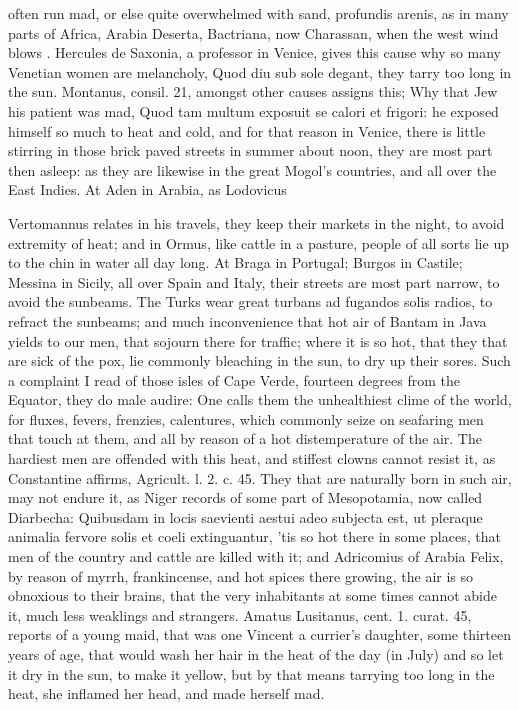 {{often run mad, or else quite overwhelmed with sand, profundis arenis,
as in many parts of Africa, Arabia Deserta, Bactriana, now Charassan,
when the west wind blows .
Hercules de Saxonia, a professor in Venice, gives this cause why
so many Venetian women are melancholy, Quod diu sub sole degant, they
tarry too long in the sun. Montanus, consil. 21, amongst other causes
assigns this; Why that Jew his patient was mad, Quod tam multum
exposuit se calori et frigori: he exposed himself so much to heat and
cold, and for that reason in Venice, there is little stirring in those
brick paved streets in summer about noon, they are most part then
asleep: as they are likewise in the great Mogol's countries, and all
over the East Indies. At Aden in Arabia, as Lodovicus

Vertomannus relates in his travels, they keep their markets in the
night, to avoid extremity of heat; and in Ormus, like cattle in a
pasture, people of all sorts lie up to the chin in water all day long.
At Braga in Portugal; Burgos in Castile; Messina in Sicily, all over
Spain and Italy, their streets are most part narrow, to avoid the
sunbeams. The Turks wear great turbans ad fugandos solis radios, to
refract the sunbeams; and much inconvenience that hot air of Bantam in
Java yields to our men, that sojourn there for traffic; where it is so
hot, that they that are sick of the pox, lie commonly bleaching
in the sun, to dry up their sores. Such a complaint I read of those
isles of Cape Verde, fourteen degrees from the Equator, they do male
audire: One calls them the unhealthiest clime of the world, for
fluxes, fevers, frenzies, calentures, which commonly seize on seafaring
men that touch at them, and all by reason of a hot distemperature of
the air. The hardiest men are offended with this heat, and stiffest
clowns cannot resist it, as Constantine affirms, Agricult. l. 2. c. 45.
They that are naturally born in such air, may not endure it, as
Niger records of some part of Mesopotamia, now called Diarbecha:
Quibusdam in locis saevienti aestui adeo subjecta est, ut pleraque
animalia fervore solis et coeli extinguantur, 'tis so hot there in some
places, that men of the country and cattle are killed with it; and
Adricomius of Arabia Felix, by reason of myrrh, frankincense, and
hot spices there growing, the air is so obnoxious to their brains, that
the very inhabitants at some times cannot abide it, much less weaklings
and strangers. Amatus Lusitanus, cent. 1. curat. 45, reports of a
young maid, that was one Vincent a currier's daughter, some thirteen
years of age, that would wash her hair in the heat of the day (in July)
and so let it dry in the sun, to make it yellow, but by that
means tarrying too long in the heat, she inflamed her head, and made
herself mad.

}}
